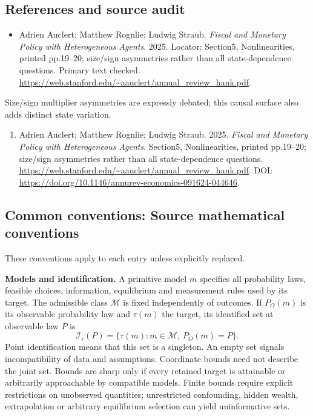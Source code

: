 \documentclass[11pt,a4paper]{article}
\begin{document}
\subsection*{References and source audit}
\begin{itemize}
\item Adrien Auclert; Matthew Rognlie; Ludwig Straub. \emph{Fiscal and Monetary Policy with Heterogeneous Agents}. 2025. Locator: Section5, Nonlinearities, printed pp.19--20; size/sign asymmetries rather than all state-dependence questions. Primary text checked. \url{https://web.stanford.edu/~aauclert/annual_review_hank.pdf}.
\end{itemize}
Size/sign multiplier asymmetries are expressly debated; this causal surface also adds distinct state variation.
\begin{enumerate}\raggedright
\item\hypertarget{definitions:source:30007532:1}{} Adrien Auclert; Matthew Rognlie; Ludwig Straub. 2025. \emph{Fiscal and Monetary Policy with Heterogeneous Agents}. Section5, Nonlinearities, printed pp.19--20; size/sign asymmetries rather than all state-dependence questions.
\url{https://web.stanford.edu/~aauclert/annual_review_hank.pdf}.
DOI: \url{https://doi.org/10.1146/annurev-economics-091624-044646}.
\end{enumerate}

\subsection*{Common conventions: Source mathematical conventions}

These conventions apply to each entry unless explicitly replaced.

\textbf{Models and identification.} A primitive model \(m\) specifies all probability laws, feasible choices, information, equilibrium and measurement rules used by its target. The admissible class \(\mathcal M\) is fixed independently of outcomes. If \(P_O(m)\) is its observable probability law and \(\tau(m)\) the target, its identified set at observable law \(P\) is
\[
 \mathcal I_\tau(P)=\{\tau(m):m\in\mathcal M,\ P_O(m)=P\}.
\]
Point identification means that this set is a singleton. An empty set signals incompatibility of data and assumptions. Coordinate bounds need not describe the joint set. Bounds are sharp only if every retained target is attainable or arbitrarily approachable by compatible models. Finite bounds require explicit restrictions on unobserved quantities; unrestricted confounding, hidden wealth, extrapolation or arbitrary equilibrium selection can yield uninformative sets.
\end{document}
